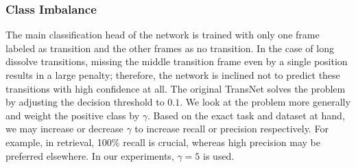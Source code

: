 \subsubsection{Class Imbalance}
The main classification head of the network is trained with only one frame labeled as transition and the other frames as no transition. In the case of long dissolve transitions, missing the middle transition frame even by a single position results in a large penalty; therefore, the network is inclined not to predict these transitions with high confidence at all. The original TransNet solves the problem by adjusting the decision threshold to $0.1$. We look at the problem more generally and weight the positive class by $\gamma$. Based on the exact task and dataset at hand, we may increase or decrease $\gamma$ to increase recall or precision respectively. For example, in retrieval, 100\% recall is crucial, whereas high precision may be preferred elsewhere. %
In our experiments, $\gamma = 5$ is used.

